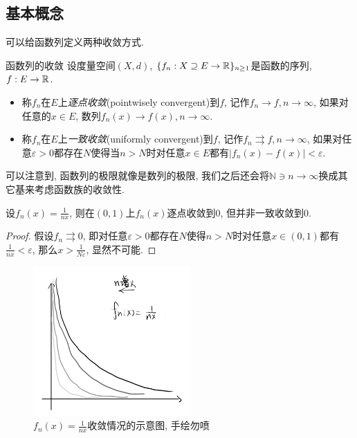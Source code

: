 \subsection{基本概念}

可以给函数列定义两种收敛方式. 

\begin{definition}{函数列的收敛}
	设度量空间$(X,d)$, $\{ f_n :X \supseteq E \to \mathbb{R} \}_{n\geq 1}$是函数的序列, $f:E \to \mathbb{R}$. 
	\begin{itemize}
		\item 称$f_n$在$E$上\textit{逐点收敛}(pointwisely convergent)到$f$, 记作$f_n \to f,n\to \infty$, 如果对任意的$x \in E$, 数列$f_n(x) \to f(x),n \to \infty$. 
		\item 称$f_n$在$E$上\textit{一致收敛}(uniformly convergent)到$f$, 记作$f_n \rightrightarrows f,n\to \infty$, 如果对任意$\varepsilon >0$都存在$N$使得当$n>N$时对任意$x \in E$都有$|f_n(x)-f(x)|<\varepsilon$. 
	\end{itemize}
\end{definition}
\begin{remark}
	可以注意到, 函数列的极限就像是数列的极限, 我们之后还会将$\mathbb{N} \ni n \to \infty$换成其它基来考虑函数族的收敛性. 
\end{remark}

\begin{example}
	设$f_n(x)=\frac{1}{nx}$, 则在$(0,1)$上$f_n(x)$逐点收敛到$0$, 但并非一致收敛到$0$. 
\end{example}
\begin{proof}
	假设$f_n \rightrightarrows 0$, 即对任意$\varepsilon >0$都存在$N$使得$n>N$时对任意$x \in (0,1)$都有$\frac{1}{nx}<\varepsilon$, 那么$x > \frac{1}{N\varepsilon}$, 显然不可能. 
\end{proof}

\begin{figure}[H]
	\centering
	\includegraphics[width=6cm]{attachment/IMG_3545.jpg}
	\caption{$f_n(x)=\frac{1}{nx}$收敛情况的示意图, 手绘勿喷}
\end{figure}

